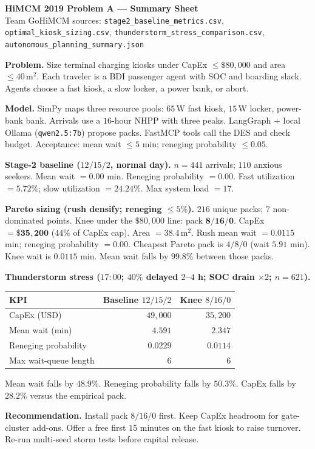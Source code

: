 \documentclass[11pt]{article}
\begin{document}
\begin{center}
{\Large\bfseries HiMCM 2019 Problem A --- Summary Sheet}\\[0.2em]
{\small Team GoHiMCM \quad
sources:
\texttt{stage2\_baseline\_metrics.csv},
\texttt{optimal\_kiosk\_sizing.csv},
\texttt{thunderstorm\_stress\_comparison.csv},
\texttt{autonomous\_planning\_summary.json}}
\end{center}
\vspace{0.35em}

\noindent\textbf{Problem.}
Size terminal charging kiosks under CapEx $\le\$80{,}000$ and area
$\le 40\,\mathrm{m}^2$.
Each traveler is a BDI passenger agent with SOC and boarding slack.
Agents choose a fast kiosk, a slow locker, a power bank, or abort.

\medskip
\noindent\textbf{Model.}
SimPy maps three resource pools: $65$\,W fast kiosk, $15$\,W locker,
power-bank bank.
Arrivals use a $16$-hour NHPP with three peaks.
LangGraph + local Ollama (\texttt{qwen2.5:7b}) propose packs.
FastMCP tools call the DES and check budget.
Acceptance: mean wait $\le 5$ min; reneging probability $\le 0.05$.

\medskip
\noindent\textbf{Stage-2 baseline ($12/15/2$, normal day).}
$n=441$ arrivals; $110$ anxious seekers.
Mean wait $=0.00$ min.
Reneging probability $=0.00$.
Fast utilization $=5.72\%$; slow utilization $=24.24\%$.
Max system load $=17$.

\medskip
\noindent\textbf{Pareto sizing (rush densify; reneging $\le 5\%$).}
$216$ unique packs; $7$ non-dominated points.
Knee under the $\$80{,}000$ line: pack $\mathbf{8/16/0}$.
CapEx $=\mathbf{\$35{,}200}$ ($44\%$ of CapEx cap).
Area $=38.4\,\mathrm{m}^2$.
Rush mean wait $=0.0115$ min; reneging probability $=0.00$.
Cheapest Pareto pack is $4/8/0$ (wait $5.91$ min).
Knee wait is $0.0115$ min.
Mean wait falls by $99.8\%$ between those packs.

\medskip
\noindent\textbf{Thunderstorm stress ($17{:}00$; $40\%$ delayed $2$--$4$ h;
SOC drain $\times 2$; $n=621$).}
\begin{center}
\begin{tabular}{lrr}
\toprule
KPI & Baseline $12/15/2$ & Knee $8/16/0$ \\
\midrule
CapEx (USD) & $49{,}000$ & $35{,}200$ \\
Mean wait (min) & $4.591$ & $2.347$ \\
Reneging probability & $0.0229$ & $0.0114$ \\
Max wait-queue length & $6$ & $6$ \\
\bottomrule
\end{tabular}
\end{center}
\vspace{0.25em}
Mean wait falls by $48.9\%$.
Reneging probability falls by $50.3\%$.
CapEx falls by $28.2\%$ versus the empirical pack.

\medskip
\noindent\textbf{Recommendation.}
Install pack $8/16/0$ first.
Keep CapEx headroom for gate-cluster add-ons.
Offer a free first $15$ minutes on the fast kiosk to raise turnover.
Re-run multi-seed storm tests before capital release.
\end{document}
